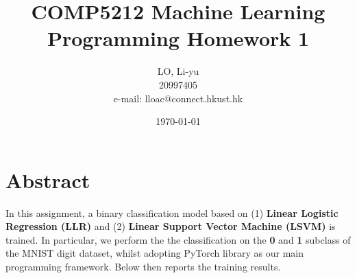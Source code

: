 \documentclass[a4paper,12pt]{article}
\begin{document}
%
   \title{\textbf{COMP5212 Machine Learning} \\  
   Programming Homework 1}
   
   \author{LO, Li-yu \\ 20997405 \\ e-mail: lloac@connect.hkust.hk}
   \date{\today}
   \maketitle

\vspace*{-1.2cm}
\section*{Abstract}
\vspace*{-0.4cm}
In this assignment, a binary classification model based on 
(1) \textbf{Linear Logistic Regression (LLR)} and 
(2) \textbf{Linear Support Vector Machine (LSVM)} is trained.
In particular, we perform the the classification on the \textbf{0} and \textbf{1} 
subclass of the MNIST digit dataset, whilst adopting PyTorch library as our main 
programming framework. Below then reports the training results.
\end{document}
